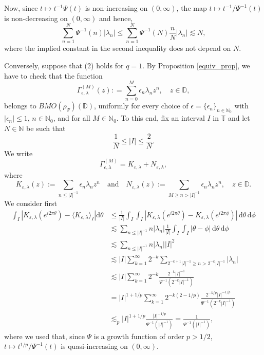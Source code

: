 \documentclass[a4paper, leqno, 10pt]{amsart}
\numberwithin{equation}{section}
\newcommand{\dd}{\mathrm{d}}
\newcommand{\T}{\mathbb{T}}
\newcommand{\D}{\mathbb{D}}
\newcommand{\N}{\mathbb{N}}
\newcommand{\eps}{\varepsilon}
\begin{document}
Now, since $t \mapsto t^{-1} \Psi(t)$ is non-increasing on $(0, \infty)$, the map $t \mapsto t^{-1}/ \Psi^{-1} (t)$ is non-decreasing on $(0, \infty)$ and hence,
\[
\sum_{n=1}^N {\Psi^{-1}(n)} |\lambda_n|
\leq \sum_{n=1}^N \Psi^{-1}(N) \frac{n}{N} |\lambda_n| \lesssim N,
\]
where the implied constant in the second inequality does not depend on $N$.

Conversely, suppose that (2) holds for $q=1$. By
Proposition \ref{equiv_prop}, we have to check that the function
\[
\Gamma_{\epsilon, \lambda}^{(M)} (z) : = \sum_{n=0}^M \epsilon_n \lambda_n z^n, \quad z \in \D,
\]
belongs to $BMO (\rho_{\Psi}) (\D)$, uniformly 
for every choice of $\epsilon = \{ \epsilon_n \}_{n \in \N_0}$ with $| \epsilon_n | \leq 1$, $n \in \N_0$, and for all $M \in \N_0$.
To this end, fix an interval $I$ in $\T$ and let $N \in \N$ be such that
\[
\frac{1}{N} \leq |I| \leq \frac{2}{N}.
\]
We write
\begin{equation}\label{eq:highlow}
\Gamma_{\epsilon, \lambda}^{(M)}     =
K_{\eps, \lambda} + N_{\eps, \lambda} ,
\end{equation}
where
\[ K_{\eps, \lambda} (z) :=  \sum_{n\leq |I|^{-1}} \epsilon_n \lambda_n z^n
\quad \text{and} \quad N_{\eps, \lambda} (z) := \sum_{M \geq n > |I|^{-1}} \epsilon_n \lambda_n z^n , \quad z \in \D.
\]
We consider first
\begin{align*}      \label{eq:lowfreq}
\int_I \left| K_{\eps, \lambda}(e^{i 2\pi \theta}) - \langle K_{\eps, \lambda} \rangle_I \right| \dd \theta 
&\leq \frac{1}{|I|}
\int_I \int_I \left| K_{\eps, \lambda}(e^{i 2 \pi \theta}) - K_{\eps, \lambda}(e^{i 2 \pi \phi}) \right| \, \dd \theta \, \dd \phi \\
&\lesssim  \sum_{n\leq |I|^{-1}} n |\lambda_n| \frac{1}{|I|}
\int_I \int_I \left|\theta - \phi \right| \, \dd \theta \, \dd \phi \\
&\lesssim  \sum_{n\leq |I|^{-1}} n |\lambda_n| |I|^2 \\
&\lesssim |I|  \sum_{k=1}^\infty 2^{-k} \sum_{ 2^{-k+1} |I|^{-1} \geq n> 2^{-k} |I|^{-1} } |\lambda_n|  \\
&\lesssim  |I| \sum_{k=1}^\infty 2^{-k} \frac{2^{-k} |I|^{-1}} {\Psi^{-1}(2^{-k} |I|^{-1})}  \\
&= |I|^{1+1/p} \sum_{k=1}^\infty 2^{-k (2- 1/p)} \frac{2^{-k/p} |I|^{-1/p}} {\Psi^{-1}(2^{-k} |I|^{-1})}  \\
&\lesssim_p  |I|^{1+1/p} \frac{ |I|^{-1/p}} {\Psi^{-1}( |I|^{-1})} 
=  \frac{1}{\Psi^{-1}( |I|^{-1})},
\end{align*}
where we used that, since $\Psi$ is a growth function of order $p > 1/2 $, $t \mapsto  t^{1/p} / \Psi^{-1}(t)$ is quasi-increasing on $(0, \infty)$. 
   
\end{document}
